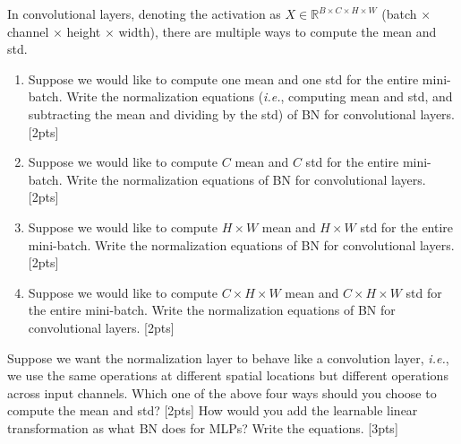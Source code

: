 \documentclass{article}
\begin{document}
In convolutional layers, denoting the activation as $X \in \mathbb{R}^{B \times C \times H \times W}$ (batch $\times$ channel $\times$ height $\times$ width), there are multiple ways to compute the mean and std.
\begin{enumerate}
    \item Suppose we would like to compute one mean and one std for the entire mini-batch. Write the normalization equations (\textit{i.e.}, computing mean and std, and subtracting the mean and dividing by the std) of BN for convolutional layers. [2pts]
    \item Suppose we would like to compute $C$ mean and $C$ std for the entire mini-batch. Write the normalization equations of BN for convolutional layers. [2pts]
    \item Suppose we would like to compute $H \times W$ mean and $H \times W$ std for the entire mini-batch. Write the normalization equations of BN for convolutional layers. [2pts]
    \item Suppose we would like to compute $C \times H \times W$ mean and $C \times H \times W$ std for the entire mini-batch. Write the normalization equations of BN for convolutional layers. [2pts]
\end{enumerate}
Suppose we want the normalization layer to behave like a convolution layer, \textit{i.e.}, we use the same operations at different spatial locations but different operations across input channels. Which one of the above four ways should you choose to compute the mean and std? [2pts] How would you add the learnable linear transformation as what BN does for MLPs? Write the equations. [3pts]\\
\end{document}

